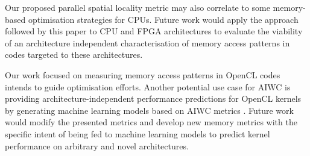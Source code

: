 \documentclass[review=false, sigchi]{acmart}
\begin{document}
	Our proposed parallel spatial locality metric may also correlate to some memory-based optimisation strategies for CPUs. Future work would apply the approach followed by this paper to CPU and FPGA architectures to evaluate the viability of an architecture independent characterisation of memory access patterns in codes targeted to these architectures.
	
	Our work focused on measuring memory access patterns in OpenCL codes intends to guide optimisation efforts. Another potential use case for AIWC is providing architecture-independent performance predictions for OpenCL kernels by generating machine learning models based on AIWC metrics \cite{beauperformanceprediction}.  Future work would modify the presented metrics and develop new memory metrics with the specific intent of being fed to machine learning models to predict kernel performance on arbitrary and novel architectures. %
	
	
	
	
\end{document}
